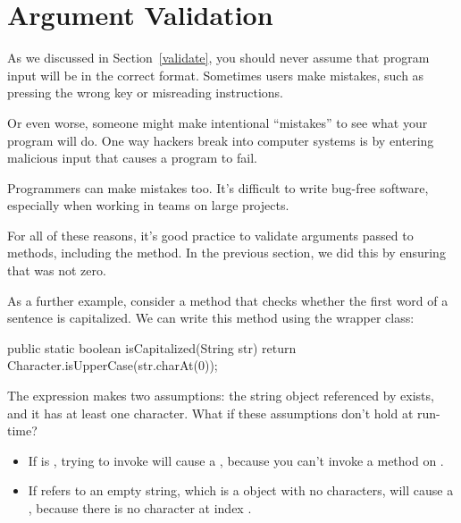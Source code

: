 \section{Argument Validation}

As we discussed in Section~\ref{validate}, you should never assume that program input will be in the correct format.
Sometimes users make mistakes, such as pressing the wrong key or misreading instructions.


Or even worse, someone might make intentional ``mistakes'' to see what your program will do.
One way hackers break into computer systems is by entering malicious input that causes a program to fail.

Programmers can make mistakes too.
It's difficult to write bug-free software, especially when working in teams on large projects.


For all of these reasons, it's good practice to validate arguments passed to methods, including the  method.
In the previous section, we did this by ensuring that  was not zero.


As a further example, consider a method that checks whether the first word of a sentence is capitalized.
We can write this method using the  wrapper class:

\begin{code}
public static boolean isCapitalized(String str) {
    return Character.isUpperCase(str.charAt(0));
}
\end{code}

The expression  makes two assumptions: the string object referenced by  exists, and it has at least one character.
What if these assumptions don't hold at run-time?

\begin{itemize}


\item If  is , trying to invoke
 will cause a , because you can't invoke a method on .


\item If  refers to an empty string, which is a  object with no characters,  will cause a , because there is no character at index .

\end{itemize}


